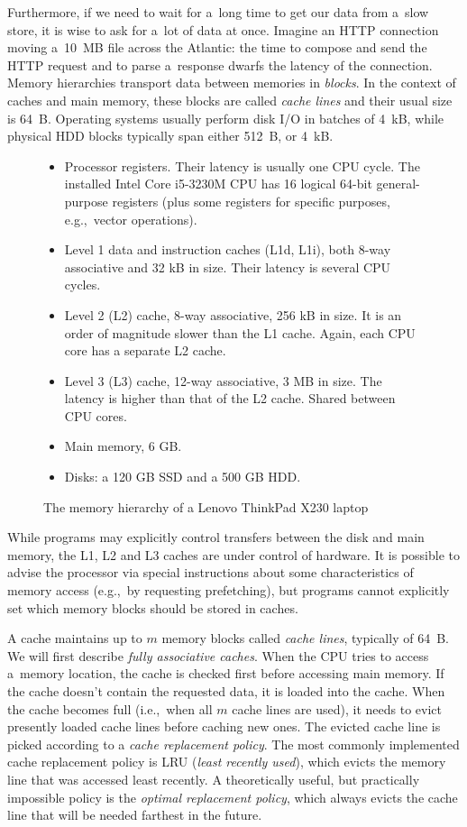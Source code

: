 Furthermore, if we need to wait for a~long time to get our data from a~slow
store, it is wise to ask for a~lot of data at once. Imagine an HTTP connection
moving a~10~MB file across the Atlantic: the time to compose and send the HTTP
request and to parse a~response dwarfs the latency of the connection.
Memory hierarchies transport data between memories in \emph{blocks}.
In the context of caches and main memory, these blocks are called
\emph{cache lines} and their usual size is 64~B.
Operating systems usually perform disk I/O in batches of 4~kB,
while physical HDD blocks typically span either 512~B, or 4~kB.

\begin{figure}
\begin{itemize}
\item Processor registers. Their latency is usually one CPU cycle.
	The installed Intel Core i5-3230M CPU has 16 logical 64-bit
	general-purpose registers (plus some registers for specific purposes,
	e.g.,\ vector operations).
\item Level 1 data and instruction caches (L1d, L1i), both 8-way associative
	and 32 kB in size. Their latency is several CPU cycles.
\item Level 2 (L2) cache, 8-way associative, 256 kB in size.
	It is an order of magnitude slower than the L1 cache. Again, each
	CPU core has a separate L2 cache.
\item Level 3 (L3) cache, 12-way associative, 3 MB in size.
	The latency is higher than that of the L2 cache. Shared between CPU
	cores.
\item Main memory, 6 GB.
\item Disks: a 120 GB SSD and a 500 GB HDD.
\end{itemize}
\caption{The memory hierarchy of a Lenovo ThinkPad X230 laptop}
\end{figure}

While programs may explicitly control transfers between the disk and main
memory, the L1, L2 and L3 caches are under control of hardware.
It is possible to advise the processor via special instructions about some
characteristics of memory access (e.g.,\ by requesting prefetching), but
programs cannot explicitly set which memory blocks should be stored in caches.

A cache maintains up to $m$ memory blocks called \textit{cache lines},
typically of 64~B.
We will first describe \emph{fully associative caches}.
When the CPU tries to access a~memory location, the cache is checked first
before accessing main memory. If the cache doesn't contain the requested data,
it is loaded into the cache. When the cache becomes full (i.e.,\ when all $m$
cache lines are used), it needs to evict presently loaded cache lines before
caching new ones. The evicted cache line is picked according to a \emph{cache
replacement policy}. The most commonly implemented cache replacement policy is
LRU (\emph{least recently used}), which evicts the memory line that was
accessed least recently.
A theoretically useful, but practically impossible policy is the \emph{optimal
replacement policy}, which always evicts the cache line that will be needed
farthest in the future.

